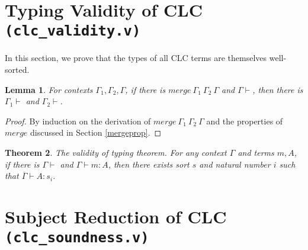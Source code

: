 \documentclass{article}
\newtheorem{theorem}{Theorem}[section]
\newtheorem{lemma}[theorem]{Lemma}
\theoremstyle{definition}
\newcommand{\mrg}[3]{merge\ {#1}\ {#2}\ {#3}}
\begin{document}
\section{Typing Validity of CLC \texttt{(clc_validity.v)}}

In this section, we prove that the types of all CLC terms are themselves well-sorted.

\begin{lemma}\label{mergecontextokinv}
  For contexts $\Gamma_1, \Gamma_2, \Gamma$, if there is $\mrg{\Gamma_1}{\Gamma_2}{\Gamma}$ and $\Gamma \vdash$, then there is $\Gamma_1 \vdash$ and $\Gamma_2 \vdash$.
\end{lemma}
\begin{proof}
  By induction on the derivation of $\mrg{\Gamma_1}{\Gamma_2}{\Gamma}$ and the properties of $merge$ discussed in Section \ref{mergeprop}.
\end{proof}

\begin{theorem}\label{validity}
  The validity of typing theorem. For any context $\Gamma$ and terms $m, A$, if there is $\Gamma \vdash$ and $\Gamma \vdash m : A$, then there exists sort $s$ and natural number $i$ such that $\overline{\Gamma} \vdash A : s_i$.
\end{theorem}

\section{Subject Reduction of CLC \texttt{(clc_soundness.v)}}
\end{document}

